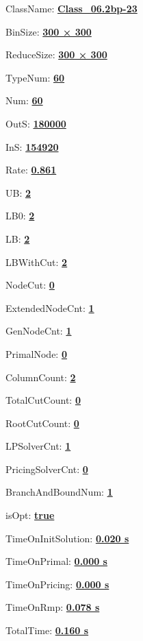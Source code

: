\documentclass[11pt]{article}
\begin{document}
\pagestyle{empty}


ClassName: \underline{\textbf{Class_06.2bp-23}}
\par
BinSize: \underline{\textbf{300 × 300}}
\par
ReduceSize: \underline{\textbf{300 × 300}}
\par
TypeNum: \underline{\textbf{60}}
\par
Num: \underline{\textbf{60}}
\par
OutS: \underline{\textbf{180000}}
\par
InS: \underline{\textbf{154920}}
\par
Rate: \underline{\textbf{0.861}}
\par
UB: \underline{\textbf{2}}
\par
LB0: \underline{\textbf{2}}
\par
LB: \underline{\textbf{2}}
\par
LBWithCut: \underline{\textbf{2}}
\par
NodeCut: \underline{\textbf{0}}
\par
ExtendedNodeCnt: \underline{\textbf{1}}
\par
GenNodeCnt: \underline{\textbf{1}}
\par
PrimalNode: \underline{\textbf{0}}
\par
ColumnCount: \underline{\textbf{2}}
\par
TotalCutCount: \underline{\textbf{0}}
\par
RootCutCount: \underline{\textbf{0}}
\par
LPSolverCnt: \underline{\textbf{1}}
\par
PricingSolverCnt: \underline{\textbf{0}}
\par
BranchAndBoundNum: \underline{\textbf{1}}
\par
isOpt: \underline{\textbf{true}}
\par
TimeOnInitSolution: \underline{\textbf{0.020 s}}
\par
TimeOnPrimal: \underline{\textbf{0.000 s}}
\par
TimeOnPricing: \underline{\textbf{0.000 s}}
\par
TimeOnRmp: \underline{\textbf{0.078 s}}
\par
TotalTime: \underline{\textbf{0.160 s}}
\par
\newpage
\end{document}
